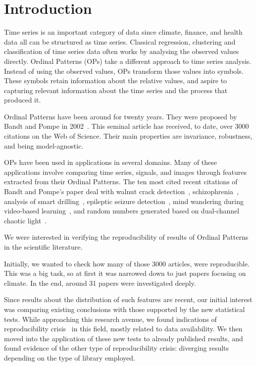 
\chapter{Introduction}

Time series is an important category of data since climate, finance, and health data all can be structured as time series. 
Classical regression, clustering and classification of time series data often works by analysing the observed values directly. 
Ordinal Patterns (OPs) take a different approach to time series analysis.
Instead of using the observed values, OPs transform those values into symbols.
These symbols retain information about the relative values, and aspire to capturing relevant information about the time series and the process that produced it.

Ordinal Patterns have been around for twenty years.
They were proposed by Bandt and Pompe in 2002~\cite{Bandt2002}.
This seminal article has received, to date, over \num{3000} citations on the Web of Science.
Their main properties are invariance, robustness, and being model-agnostic.

OPs have been used in applications in several domains.
Many of these applications involve comparing time series, signals, and images through features extracted from their Ordinal Patterns.
The ten most cited recent citations of Bandt and Pompe's paper deal with walnut crack detection~\cite{Zhang2024}, 
schizophrenia~\cite{Wang2024}, 
analysis of smart drilling~\cite{Szwajka2024}, 
epileptic seizure detection~\cite{AbhishekParikh2024}, 
mind wandering during video-based learning~\cite{Tang2024}, 
and random numbers generated based on dual-channel chaotic light~\cite{Liu2024}. 

We were interested in verifying the reproducibility of results of Ordinal Patterns in the scientific literature.

Initially, we wanted to check how many of those \num{3000} articles, were reproducible. 
This was a big task, so at first it was narrowed down to just papers focusing on climate. 
In the end, around \num{31} papers were investigated deeply.

Since results about the distribution of such features are recent, our initial interest was comparing existing conclusions with those supported by the new statistical tests.
While approaching this research avenue, we found indications of reproducibility crisis~\cite{Fidler2018} in this field, mostly related to data availability.
We then moved into the application of these new tests to already published results, and found evidence of the other type of reproducibility crisis: diverging results depending on the type of library employed.

